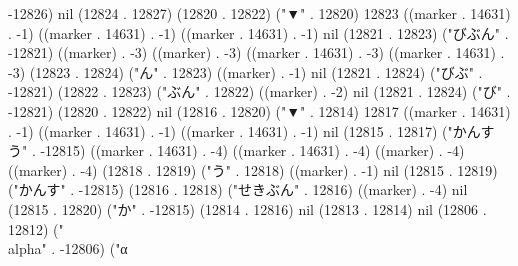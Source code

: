 -12826) nil (12824 . 12827) (12820 . 12822) ("▼" . 12820) 12823 ((marker . 14631) . -1) ((marker . 14631) . -1) ((marker . 14631) . -1) nil (12821 . 12823) ("びぶん" . -12821) ((marker) . -3) ((marker) . -3) ((marker . 14631) . -3) ((marker . 14631) . -3) (12823 . 12824) ("ん" . 12823) ((marker) . -1) nil (12821 . 12824) ("びぶ" . -12821) (12822 . 12823) ("ぶん" . 12822) ((marker) . -2) nil (12821 . 12824) ("び" . -12821) (12820 . 12822) nil (12816 . 12820) ("▼" . 12814) 12817 ((marker . 14631) . -1) ((marker . 14631) . -1) ((marker . 14631) . -1) nil (12815 . 12817) ("かんすう" . -12815) ((marker . 14631) . -4) ((marker . 14631) . -4) ((marker) . -4) ((marker) . -4) (12818 . 12819) ("う" . 12818) ((marker) . -1) nil (12815 . 12819) ("かんす" . -12815) (12816 . 12818) ("せきぶん" . 12816) ((marker) . -4) nil (12815 . 12820) ("か" . -12815) (12814 . 12816) nil (12813 . 12814) nil (12806 . 12812) ("\\alpha" . -12806) ("α
